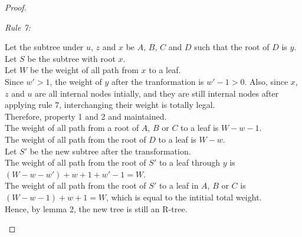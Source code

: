 \documentclass[10pt]{article}
\begin{document}
\begin{enumerate}
\begin{proof}
\begin{addmargin}[1em]{0em}
		\textit{Rule 7:}
		\begin{addmargin}[1em]{0em}
			Let the subtree under $u$, $z$ and $x$ be $A$, $B$, $C$ and $D$
			such that the root of $D$ is $y$. \\
			Let $S$ be the subtree with root $x$. \\
			Let $W$ be the weight of all path from $x$ to a leaf. \\
			Since $w' > 1$, the weight of $y$ after the tranformation is $w'-1
			> 0$.
			Also, since $x$, $z$ and $u$ are all internal nodes intially, and
			they are still internal nodes after applying rule 7, interchanging
			their weight is totally legal. \\
			Therefore, property 1 and 2 and maintained. \\
			The weight of all path from a root of $A$, $B$ or $C$ to a
			leaf is $W-w-1$. \\
			The weight of all path from the root of $D$ to a leaf is $W-w$. \\
			Let $S'$ be the new subtree after the transformation. \\
			The weight of all path from the root of $S'$ to a leaf through $y$
			is $(W-w-w') + w+1+w'-1 = W$. \\
			The weight of all path from the root of $S'$ to a leaf in $A$, $B$
			or $C$ is $(W-w-1)+w+1 = W$, which is equal to the intitial total
			weight. \\
			Hence, by lemma 2, the new tree is still an R-tree.
		\end{addmargin}


\end{addmargin}
\end{proof}
\end{enumerate}
\end{document}
